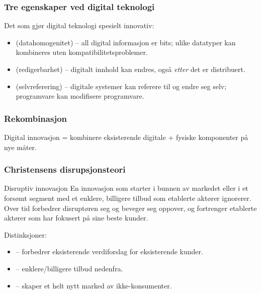 \subsubsection*{Tre egenskaper ved digital teknologi}
Det som gjør digital teknologi spesielt innovativ:
\begin{itemize}
  \item {} (datahomogenitet) -- all digital informasjon
    er bits; ulike datatyper kan kombineres uten kompatibilitetsproblemer.
  \item {} (redigerbarhet) -- digitalt innhold kan endres,
    også \emph{etter} det er distribuert.
  \item {} (selvreferering) -- digitale systemer kan
    referere til og endre seg selv; programvare kan modifisere programvare.
\end{itemize}

\subsubsection*{Rekombinasjon}
Digital innovasjon = kombinere eksisterende digitale + fysiske komponenter på
nye måter. 

\subsubsection*{Christensens disrupsjonsteori}

\begin{definition}{Disruptiv innovasjon}
En innovasjon som starter i bunnen av markedet eller i et forsømt segment
med et enklere, billigere tilbud som etablerte aktører ignorerer. Over tid
forbedrer disruptøren seg og beveger seg oppover, og fortrenger etablerte
aktører som har fokusert på sine beste kunder.
\end{definition}

Distinksjoner:
\begin{itemize}
  \item {} -- forbedrer eksisterende verdiforslag
    for eksisterende kunder.
  \item {} -- enklere/billigere tilbud nedenfra.
  \item {} -- skaper et helt nytt marked av
    ikke-konsumenter.
\end{itemize}

